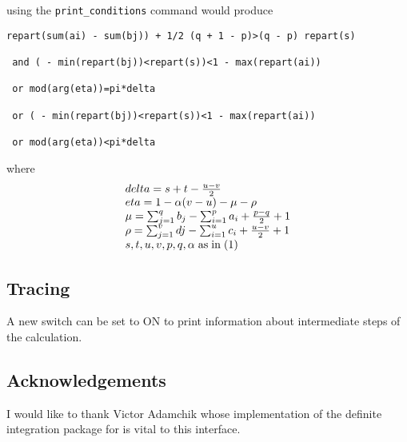 using the \verb+print_conditions+ command would produce

\begin{verbatim}
repart(sum(ai) - sum(bj)) + 1/2 (q + 1 - p)>(q - p) repart(s)

 and ( - min(repart(bj))<repart(s))<1 - max(repart(ai))

 or mod(arg(eta))=pi*delta

 or ( - min(repart(bj))<repart(s))<1 - max(repart(ai))

 or mod(arg(eta))<pi*delta
\end{verbatim}

where
\[
\begin{array}{l}
delta = s+t-\frac{u-v}{2}\\
eta = 1-\alpha(v-u)-\mu-\rho\\
\mu = \sum_{j=1}^{q} b_{j} - \sum_{i=1}^{p} a_{i} + \frac{p-q}{2} + 1\\
\rho = \sum_{j=1}^{v} d{j} - \sum_{i=1}^{u} c_{i} + \frac{u-v}{2} + 1\\
s,t,u,v,p,q,\alpha \; {\rm as \; in \; (1)}
\end{array}
\]


\subsection{Tracing}

A new switch  can be set to ON to print information about intermediate steps
of the calculation.

\subsection{Acknowledgements}
I would like to thank Victor Adamchik whose implementation of the
definite integration package for {\REDUCE} is vital to this
interface.
